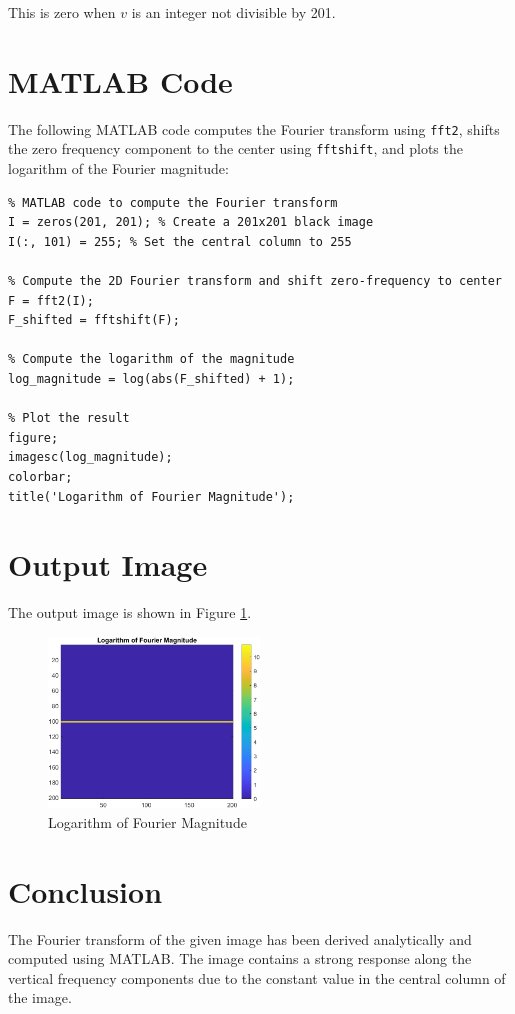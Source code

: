 \documentclass{article}
\begin{document}
This is zero when \( v \) is an integer not divisible by 201.

\section*{MATLAB Code}

The following MATLAB code computes the Fourier transform using \texttt{fft2}, shifts the zero frequency component to the center using \texttt{fftshift}, and plots the logarithm of the Fourier magnitude:

\begin{verbatim}
% MATLAB code to compute the Fourier transform
I = zeros(201, 201); % Create a 201x201 black image
I(:, 101) = 255; % Set the central column to 255

% Compute the 2D Fourier transform and shift zero-frequency to center
F = fft2(I);
F_shifted = fftshift(F);

% Compute the logarithm of the magnitude
log_magnitude = log(abs(F_shifted) + 1);

% Plot the result
figure;
imagesc(log_magnitude);
colorbar;
title('Logarithm of Fourier Magnitude');
\end{verbatim}

\section*{Output Image}

The output image is shown in Figure \ref{fig:q4}.
\begin{figure}[H]
    \centering
    \includegraphics[width=0.5\textwidth]{fourier_output.png}
    \caption{Logarithm of Fourier Magnitude}
    \label{fig:q4}
\end{figure}

\section*{Conclusion}

The Fourier transform of the given image has been derived analytically and computed using MATLAB. The image contains a strong response along the vertical frequency components due to the constant value in the central column of the image.
\end{document}

